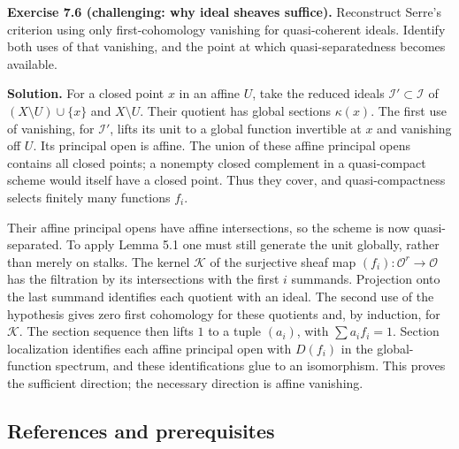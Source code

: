 \documentclass[11pt]{article}
\begin{document}
\textbf{Exercise 7.6 (challenging: why ideal sheaves suffice).}
Reconstruct Serre's criterion using only first-cohomology vanishing for
quasi-coherent ideals. Identify both uses of that vanishing, and the
point at which quasi-separatedness becomes available.

\textbf{Solution.} For a closed point \(x\) in an affine \(U\), take the
reduced ideals \(\mathcal I'\subset\mathcal I\) of
\((X\setminus U)\cup\{x\}\) and \(X\setminus U\). Their quotient has
global sections \(\kappa(x)\). The first use of vanishing, for
\(\mathcal I'\), lifts its unit to a global function invertible at \(x\)
and vanishing off \(U\). Its principal open is affine. The union of
these affine principal opens contains all closed points; a nonempty
closed complement in a quasi-compact scheme would itself have a closed
point. Thus they cover, and quasi-compactness selects finitely many
functions \(f_i\).

Their affine principal opens have affine intersections, so the scheme is
now quasi-separated. To apply Lemma 5.1 one must still generate the unit
globally, rather than merely on stalks. The kernel \(\mathcal K\) of the
surjective sheaf map \((f_i):\mathcal O^r\to\mathcal O\) has the
filtration by its intersections with the first \(i\) summands.
Projection onto the last summand identifies each quotient with an ideal.
The second use of the hypothesis gives zero first cohomology for these
quotients and, by induction, for \(\mathcal K\). The section sequence
then lifts \(1\) to a tuple \((a_i)\), with \(\sum a_i f_i=1\). Section
localization identifies each affine principal open with \(D(f_i)\) in
the global-function spectrum, and these identifications glue to an
isomorphism. This proves the sufficient direction; the necessary
direction is affine vanishing.

\subsection{References and
prerequisites}\label{references-and-prerequisites}
\end{document}
